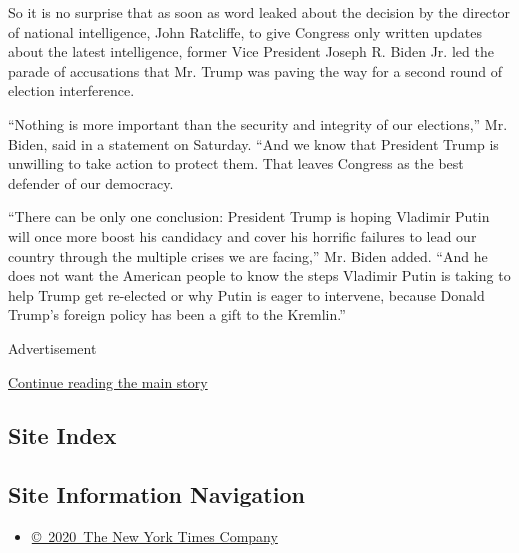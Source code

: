 So it is no surprise that as soon as word leaked about the decision by
the director of national intelligence, John Ratcliffe, to give Congress
only written updates about the latest intelligence, former Vice
President Joseph R. Biden Jr. led the parade of accusations that Mr.
Trump was paving the way for a second round of election interference.

``Nothing is more important than the security and integrity of our
elections,'' Mr. Biden, said in a statement on Saturday. ``And we know
that President Trump is unwilling to take action to protect them. That
leaves Congress as the best defender of our democracy.

``There can be only one conclusion: President Trump is hoping Vladimir
Putin will once more boost his candidacy and cover his horrific failures
to lead our country through the multiple crises we are facing,'' Mr.
Biden added. ``And he does not want the American people to know the
steps Vladimir Putin is taking to help Trump get re-elected or why Putin
is eager to intervene, because Donald Trump's foreign policy has been a
gift to the Kremlin.''

Advertisement

\protect\hyperlink{after-bottom}{Continue reading the main story}

\hypertarget{site-index}{%
\subsection{Site Index}\label{site-index}}

\hypertarget{site-information-navigation}{%
\subsection{Site Information
Navigation}\label{site-information-navigation}}

\begin{itemize}
\tightlist
\item
  \href{https://help.nytimes3xbfgragh.onion/hc/en-us/articles/115014792127-Copyright-notice}{©~2020~The
  New York Times Company}
\end{itemize}

